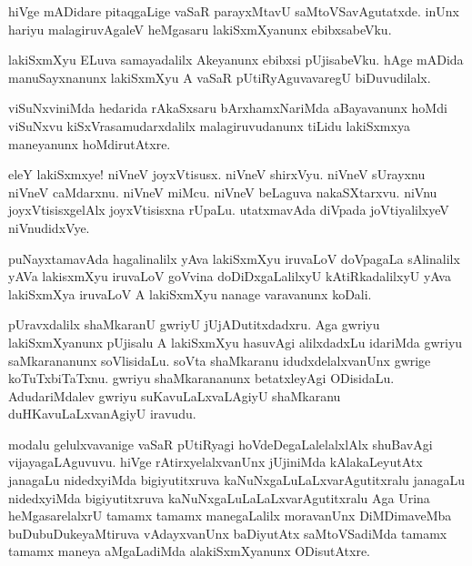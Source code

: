 \documentclass{article}
\begin{document}
\begin{mn}%
hiVge mADidare pitaqgaLige vaSaR parayxMtavU saMtoVSavAgutatxde. inUnx hariyu malagiruvAgaleV 
heMgasaru lakiSxmXyanunx ebibxsabeVku.
\end{mn}

\begin{mn}%
lakiSxmXyu ELuva samayadalilx Akeyanunx ebibxsi pUjisabeVku. hAge mADida manuSayxnanunx lakiSxmXyu 
A vaSaR pUtiRyAguvavaregU biDuvudilalx.
\end{mn}

\begin{mn}%
viSuNxviniMda hedarida rAkaSxsaru bArxhamxNariMda aBayavanunx hoMdi viSuNxvu kiSxVrasamudarxdalilx 
malagiruvudanunx tiLidu lakiSxmxya maneyanunx hoMdirutAtxre.
\end{mn}

\begin{mn}%
eleY lakiSxmxye! niVneV joyxVtisusx. niVneV shirxVyu. niVneV sUrayxnu niVneV caMdarxnu. niVneV 
miMcu. niVneV beLaguva nakaSXtarxvu. niVnu joyxVtisisxgelAlx joyxVtisisxna rUpaLu. utatxmavAda 
diVpada joVtiyalilxyeV niVnudidxVye.
\end{mn}

\begin{mn}%
puNayxtamavAda hagalinalilx yAva lakiSxmXyu iruvaLoV doVpagaLa sAlinalilx yAVa lakisxmXyu iruvaLoV 
goVvina doDiDxgaLalilxyU kAtiRkadalilxyU yAva lakiSxmXya iruvaLoV A lakiSxmXyu nanage varavanunx 
koDali.
\end{mn}

\begin{mn}%
pUravxdalilx shaMkaranU gwriyU jUjADutitxdadxru. Aga gwriyu lakiSxmXyanunx pUjisalu A lakiSxmXyu 
hasuvAgi alilxdadxLu idariMda gwriyu saMkarananunx soVlisidaLu. soVta shaMkaranu 
idudxdelalxvanUnx gwrige koTuTxbiTaTxnu. gwriyu shaMkarananunx betatxleyAgi ODisidaLu. 
AdudariMdalev gwriyu suKavuLaLxvaLAgiyU shaMkaranu duHKavuLaLxvanAgiyU iravudu.
\end{mn}

\begin{mn}%
modalu gelulxvavanige vaSaR pUtiRyagi hoVdeDegaLalelalxlAlx shuBavAgi vijayagaLAguvuvu. hiVge 
rAtirxyelalxvanUnx jUjiniMda kAlakaLeyutAtx janagaLu nidedxyiMda bigiyutitxruva 
kaNuNxgaLuLaLxvarAgutitxralu janagaLu nidedxyiMda bigiyutitxruva kaNuNxgaLuLaLaLxvarAgutitxralu 
Aga Urina heMgasarelalxrU tamamx tamamx manegaLalilx moravanUnx DiMDimaveMba buDubuDukeyaMtiruva 
vAdayxvanUnx baDiyutAtx saMtoVSadiMda tamamx tamamx maneya aMgaLadiMda alakiSxmXyanunx ODisutAtxre.
\end{mn}
\end{document}
